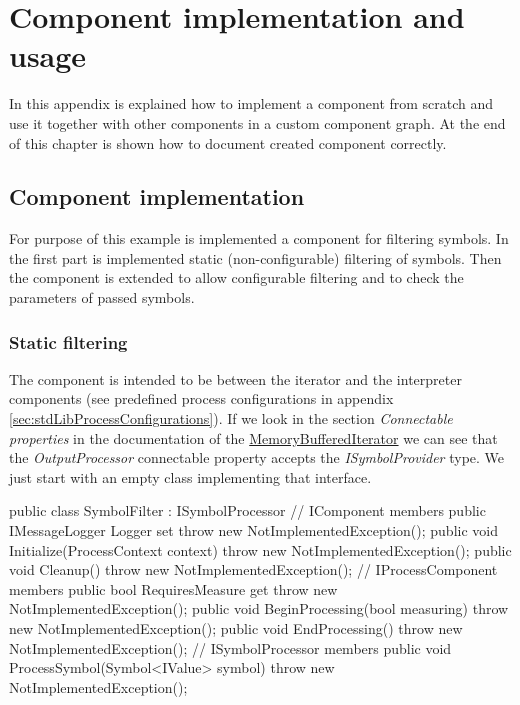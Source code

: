 

\chapter{Component implementation and usage}
\label{chap:compImpl}

In this appendix is explained how to implement a component from scratch and use it together with other components in a custom component graph.
At the end of this chapter is shown how to document created component correctly. 


\section{Component implementation}

For purpose of this example is implemented a component for filtering \lsystem symbols.
In the first part is implemented static (non-configurable) filtering of symbols.
Then the component is extended to allow configurable filtering and to check the parameters of passed symbols.

\subsection{Static filtering}

The component is intended to be between the iterator and the interpreter components (see predefined process configurations in appendix \ref{sec:stdLibProcessConfigurations}).
If we look in the section \emph{Connectable properties} in the documentation of the \hyperref[Malsys.Processing.Components.RewriterIterators.MemoryBufferedIterator]{MemoryBufferedIterator} we can see that the \emph{OutputProcessor} connectable property accepts the \emph{ISymbolProvider} type.
We just start with an empty class implementing that interface.

\begin{Csharp}
public class SymbolFilter : ISymbolProcessor {
	// IComponent members
	public IMessageLogger Logger { set { throw new NotImplementedException(); } }
	public void Initialize(ProcessContext context) {
		throw new NotImplementedException();
	}
	public void Cleanup() {
		throw new NotImplementedException();
	}
	// IProcessComponent members
	public bool RequiresMeasure { get { throw new NotImplementedException(); } }
	public void BeginProcessing(bool measuring) {
		throw new NotImplementedException();
	}
	public void EndProcessing() {
		throw new NotImplementedException();
	}
	// ISymbolProcessor members
	public void ProcessSymbol(Symbol<IValue> symbol) {
		throw new NotImplementedException();
	}
}
\end{Csharp}

